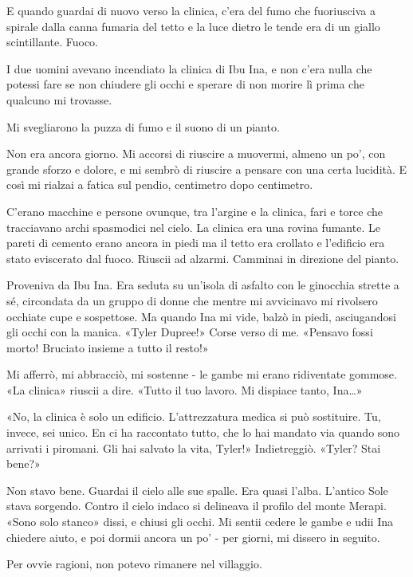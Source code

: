 E quando guardai di nuovo verso la clinica, c'era del fumo che
fuoriusciva a spirale dalla canna fumaria del tetto e la luce dietro le
tende era di un giallo scintillante. Fuoco.

I due uomini avevano incendiato la clinica di Ibu Ina, e non c'era nulla
che potessi fare se non chiudere gli occhi e sperare di non morire lì
prima che qualcuno mi trovasse.

\separatorefiori

Mi svegliarono la puzza di fumo e il suono di un pianto.

Non era ancora giorno. Mi accorsi di riuscire a muovermi, almeno un po',
con grande sforzo e dolore, e mi sembrò di riuscire a pensare con una
certa lucidità. E così mi rialzai a fatica sul pendio, centimetro dopo
centimetro.

C'erano macchine e persone ovunque, tra l'argine e la clinica, fari e
torce che tracciavano archi spasmodici nel cielo. La clinica era una
rovina fumante. Le pareti di cemento erano ancora in piedi ma il tetto
era crollato e l'edificio era stato eviscerato dal fuoco. Riuscii ad
alzarmi. Camminai in direzione del pianto.

Proveniva da Ibu Ina. Era seduta su un'isola di asfalto con le ginocchia
strette a sé, circondata da un gruppo di donne che mentre mi avvicinavo
mi rivolsero occhiate cupe e sospettose. Ma quando Ina mi vide, balzò in
piedi, asciugandosi gli occhi con la manica. «Tyler Dupree!» Corse verso
di me. «Pensavo fossi morto! Bruciato insieme a tutto il resto!»

Mi afferrò, mi abbracciò, mi sostenne - le gambe mi erano ridiventate
gommose. «La clinica» riuscii a dire. «Tutto il tuo lavoro. Mi dispiace
tanto, Ina\ldots»

«No, la clinica è solo un edificio. L'attrezzatura medica si può
sostituire. Tu, invece, sei unico. En ci ha raccontato tutto, che lo hai
mandato via quando sono arrivati i piromani. Gli hai salvato la vita,
Tyler!» Indietreggiò. «Tyler? Stai bene?»

Non stavo bene. Guardai il cielo alle sue spalle. Era quasi l'alba.
L'antico Sole stava sorgendo. Contro il cielo indaco si delineava il
profilo del monte Merapi. «Sono solo stanco» dissi, e chiusi gli occhi.
Mi sentii cedere le gambe e udii Ina chiedere aiuto, e poi dormii ancora
un po' - per giorni, mi dissero in seguito.

\separatorefiori

Per ovvie ragioni, non potevo rimanere nel villaggio.

